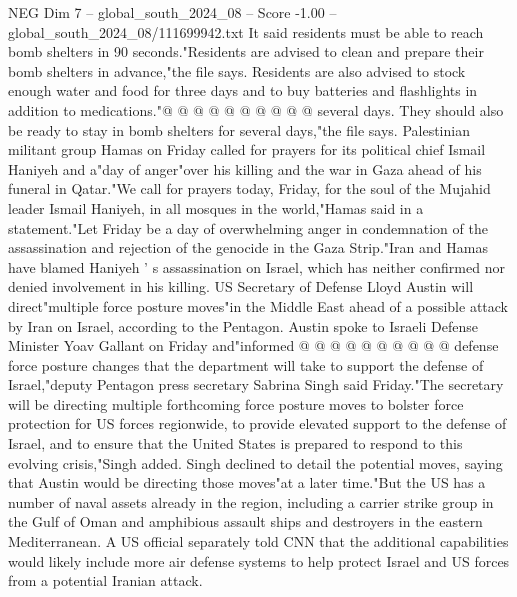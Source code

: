 \begin{textsample}{NEG Dim 7 – global\_south\_2024\_08 – Score -1.00 – global\_south\_2024\_08/111699942.txt}
It said residents must be able to reach bomb shelters in 90 seconds."Residents are advised to clean and prepare their bomb shelters in advance,"the file says.
Residents are also advised to stock enough water and food for three days and to buy batteries and flashlights in addition to medications."@ @ @ @ @ @ @ @ @ @ several days.
They should also be ready to stay in bomb shelters for several days,"the file says.
Palestinian militant group Hamas on Friday called for prayers for its political chief Ismail Haniyeh and a"day of anger"over his killing and the war in Gaza ahead of his funeral in Qatar."We call for prayers today, Friday, for the soul of the Mujahid leader Ismail Haniyeh, in all mosques in the world,"Hamas said in a statement."Let Friday be a day of overwhelming anger in condemnation of the assassination and rejection of the genocide in the Gaza Strip."Iran and Hamas have blamed Haniyeh ' s assassination on Israel, which has neither confirmed nor denied involvement in his killing.
US Secretary of Defense Lloyd Austin will direct"multiple force posture moves"in the Middle East ahead of a possible attack by Iran on Israel, according to the Pentagon.
Austin spoke to Israeli Defense Minister Yoav Gallant on Friday and"informed @ @ @ @ @ @ @ @ @ @ defense force posture changes that the department will take to support the defense of Israel,"deputy Pentagon press secretary Sabrina Singh said Friday."The secretary will be directing multiple forthcoming force posture moves to bolster force protection for US forces regionwide, to provide elevated support to the defense of Israel, and to ensure that the United States is prepared to respond to this evolving crisis,"Singh added.
Singh declined to detail the potential moves, saying that Austin would be directing those moves"at a later time."But the US has a number of naval assets already in the region, including a carrier strike group in the Gulf of Oman and amphibious assault ships and destroyers in the eastern Mediterranean.
A US official separately told CNN that the additional capabilities would likely include more air defense systems to help protect Israel and US forces from a potential Iranian attack.

\end{textsample}
